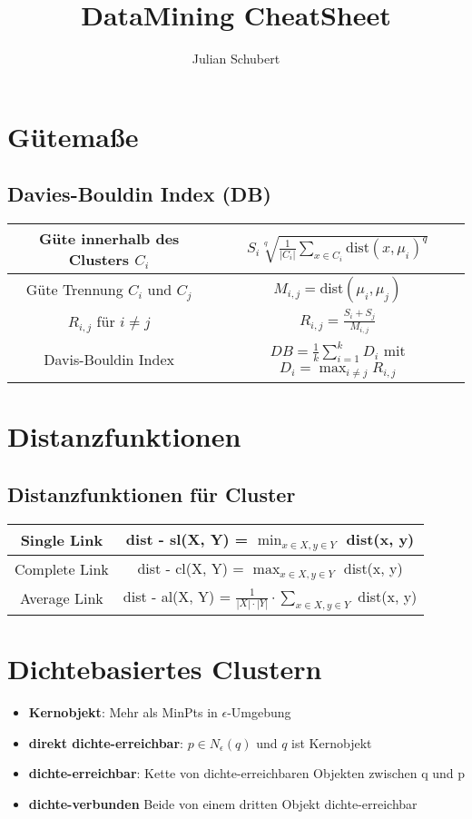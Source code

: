 \documentclass{article}
\title{DataMining CheatSheet}
\author{Julian Schubert}
\begin{document}
\maketitle

\section{Gütemaße}
\subsection{Davies-Bouldin Index (DB)}
    \begin{tabular}{| c | c |}
        \hline
        Güte innerhalb des Clusters $C_i$ 
            & $S_i \sqrt[q]{\frac{1}{|C_i|} \sum_{x \in C_i}\text{dist}(x, \mu_i)^q}$ \\
        \hline
        Güte Trennung $C_i$ und $C_j$
            & $M_{i,j} = $dist$(\mu_i, \mu_j)$ \\
        \hline
        $R_{i,j}$ für $i \neq j$
            & $R_{i, j} = \frac{S_i + S_j}{M_{i, j}}$ \\
        \hline
        Davis-Bouldin Index
            & $DB = \frac{1}{k} \sum_{i = 1}^k D_i$ mit $D_i = \max_{i \neq j} R_{i,j}$ \\
        \hline
    \end{tabular}
\section{Distanzfunktionen}
\subsection{Distanzfunktionen für Cluster}
    \begin{tabular}{| c | c |}
        \hline
        Single Link 
            & dist - sl(X, Y) = $\min_{x \in X, y \in Y}$ dist(x, y) \\
        \hline
        Complete Link
            & dist - cl(X, Y) = $\max_{x \in X, y \in Y}$ dist(x, y) \\
        \hline
        Average Link
            & dist - al(X, Y) = $\frac{1}{|X| \cdot |Y|} \cdot \sum_{x \in X, y\in Y}$ dist(x, y) \\
        \hline
    \end{tabular}
\section{Dichtebasiertes Clustern}
\begin{itemize}
    \item \textbf{Kernobjekt}: Mehr als MinPts in $\epsilon$-Umgebung
    \item \textbf{direkt dichte-erreichbar}: $p \in N_{\epsilon}(q)$ und 
    $q$ ist Kernobjekt
    \item \textbf{dichte-erreichbar}: Kette von dichte-erreichbaren
    Objekten zwischen q und p
    \item \textbf{dichte-verbunden} Beide von einem dritten Objekt
    dichte-erreichbar
\end{itemize}
\end{document}

